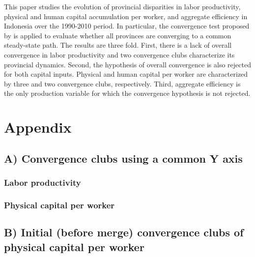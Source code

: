 \documentclass[11pt,a4paper,]{article}
\begin{document}
This paper studies the evolution of provincial disparities in labor productivity, physical and human capital accumulation per worker, and aggregate efficiency in Indonesia over the 1990-2010 period.
In particular, the convergence test proposed by \textcite{phillips2007transition} is applied to evaluate whether all provinces are converging to a common steady-state path.
The results are three fold.
First, there is a lack of overall convergence in labor productivity and two convergence clubs characterize its provincial dynamics.
Second, the hypothesis of overall convergence is also rejected for both capital inputs.
Physical and human capital per worker are characterized by three and two convergence clubs, respectively.
Third, aggregate efficiency is the only production variable for which the convergence hypothesis is not rejected.

\newpage

\hypertarget{appendix}{%
\section*{Appendix}\label{appendix}}

\hypertarget{a-convergence-clubs-using-a-common-y-axis}{%
\subsection*{A) Convergence clubs using a common Y axis}\label{a-convergence-clubs-using-a-common-y-axis}}

\hypertarget{labor-productivity}{%
\subsubsection*{Labor productivity}\label{labor-productivity}}

\hypertarget{physical-capital-per-worker}{%
\subsubsection*{Physical capital per worker}\label{physical-capital-per-worker}}

\newpage

\hypertarget{b-initial-before-merge-convergence-clubs-of-physical-capital-per-worker}{%
\subsection*{B) Initial (before merge) convergence clubs of physical capital per worker}\label{b-initial-before-merge-convergence-clubs-of-physical-capital-per-worker}}

\newpage

\printbibliography[title=References]
\end{document}
